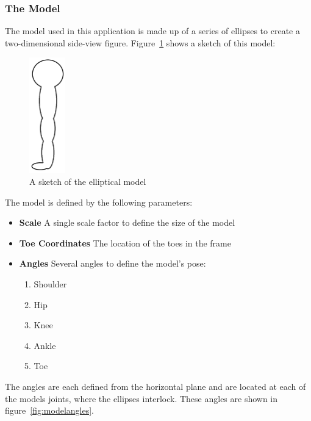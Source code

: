 \subsubsection{The Model}
\label{subsec:model}

The model used in this application is made up of a series of ellipses to create a two-dimensional side-view figure. Figure~\ref{fig:modelellipses} shows a sketch of this model:

\begin{figure}[H]
    \centering
	\includegraphics[height=5cm]{algorithm/images/model}
\caption{A sketch of the elliptical model}
\label{fig:modelellipses}
\end{figure}

The model is defined by the following parameters:

\begin{itemize}
	\item \textbf{Scale} A single scale factor to define the size of the model
	\item \textbf{Toe Coordinates} The location of the toes in the frame
	\item \textbf{Angles} Several angles to define the model's pose:
		\begin{enumerate}
			\item Shoulder
			\item Hip
			\item Knee
			\item Ankle
			\item Toe
		\end{enumerate}
\end{itemize}

The angles are each defined from the horizontal plane and are located at each of the models joints, where the ellipses interlock. These angles are shown in figure~\ref{fig:modelangles}.

